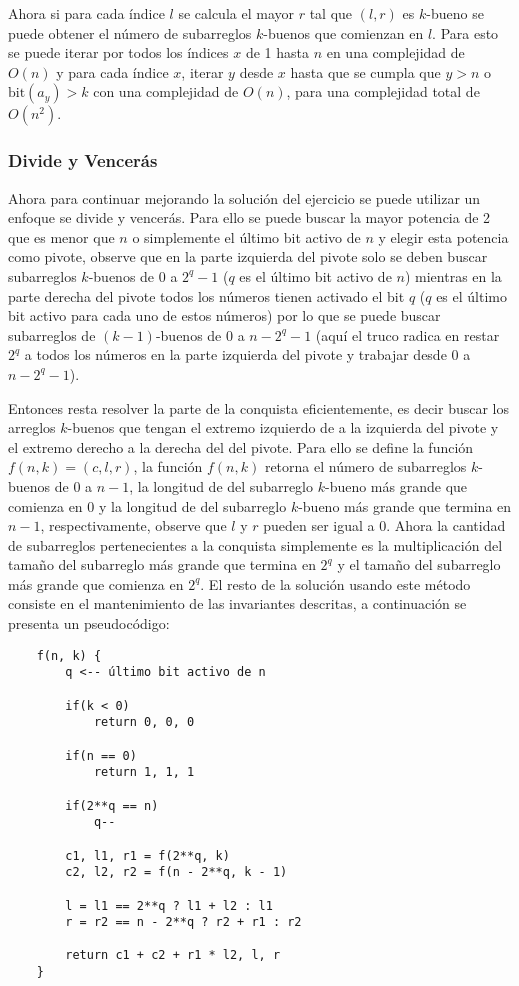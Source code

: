 \documentclass{article}
\begin{document}
Ahora si para cada índice $l$ se calcula el mayor $r$ tal que $(l,r)$ es $k$-bueno se puede obtener el número de subarreglos $k$-buenos
que comienzan en $l$. Para esto se puede iterar por todos los índices $x$ de 1 hasta $n$ en una complejidad de $O(n)$ y para cada
índice $x$, iterar $y$ desde $x$ hasta que se cumpla que $y>n$ o $\text{bit}(a_y)>k$ con una complejidad de $O(n)$, para una complejidad
total de $O(n^2)$.

\subsubsection{Divide y Vencerás}

Ahora para continuar mejorando la solución del ejercicio se puede utilizar un enfoque se divide y vencerás. Para ello se puede
buscar la mayor potencia de 2 que es menor que $n$ o simplemente el último bit activo de $n$ y elegir esta potencia como pivote,
observe que en la parte izquierda del pivote solo se deben buscar subarreglos $k$-buenos de 0 a $2^q-1$ ($q$ es el último bit activo de $n$)
mientras en la parte derecha del pivote todos los números tienen activado el bit $q$ ($q$ es el último bit activo para cada uno de
estos números) por lo que se puede buscar subarreglos de $(k-1)$-buenos de 0 a $n-2^q-1$ (aquí el truco radica en restar $2^q$ a todos los
números en la parte izquierda del pivote y trabajar desde 0 a $n-2^q-1$).

Entonces resta resolver la parte de la conquista eficientemente, es decir buscar los arreglos $k$-buenos que tengan el extremo
izquierdo de a la izquierda del pivote y el extremo derecho a la derecha del del pivote. Para ello se define la función $f(n,k)=(c,l,r)$,
la función $f(n,k)$ retorna el número de subarreglos $k$-buenos de 0 a $n-1$, la longitud de del subarreglo $k$-bueno más grande
que comienza en 0 y la longitud de del subarreglo $k$-bueno más grande que termina en $n-1$, respectivamente, observe que $l$ y $r$ pueden
ser igual a 0. Ahora la cantidad de subarreglos pertenecientes a la conquista simplemente es la multiplicación del tamaño del
subarreglo más grande que termina en $2^q$ y el tamaño del subarreglo más grande que comienza en $2^q$. El resto de la solución
usando este método consiste en el mantenimiento de las invariantes descritas, a continuación se presenta un pseudocódigo:

\begin{verbatim}
    f(n, k) {
        q <-- último bit activo de n 

        if(k < 0)
            return 0, 0, 0

        if(n == 0)
            return 1, 1, 1

        if(2**q == n) 
            q--

        c1, l1, r1 = f(2**q, k)
        c2, l2, r2 = f(n - 2**q, k - 1)

        l = l1 == 2**q ? l1 + l2 : l1
        r = r2 == n - 2**q ? r2 + r1 : r2

        return c1 + c2 + r1 * l2, l, r 
    }
\end{verbatim}
\end{document}
